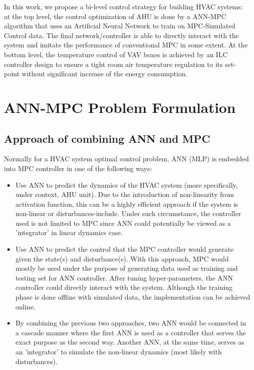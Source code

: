 \documentclass[conference]{IEEEtran}
\begin{document}
In this work, we propose a bi-level control strategy for building HVAC systems: at the top level, the control optimization of AHU is done by a ANN-MPC algorithm that uses an Artificial Neural Network to train on MPC-Simulated Control data. The final network/controller is able to directly interact with the system and imitate the performance of conventional MPC in some extent. At the bottom level, the temperature control of VAV boxes is achieved by an ILC controller design to ensure a tight room air temperature regulation to its set-point without significant increase of the energy consumption.


\section{ANN-MPC Problem Formulation}
\subsection{Approach of combining ANN and MPC}
Normally for a HVAC system optimal control problem, ANN (MLP) is embedded into MPC controller in one of the following ways:
\begin{itemize}
\item Use ANN to predict the dynamics of the HVAC system (more specifically, under context, AHU unit). Due to the introduction of non-linearity from activation function, this can be a highly efficient approach if the system is non-linear or disturbances-include. Under such circumstance, the controller used is not limited to MPC since ANN could potentially be viewed as a 'integrator' in linear dynamics case.
\item Use ANN to predict the control that the MPC controller would generate given the state(s) and disturbance(s). With this approach, MPC would mostly be used under the purpose of generating data used as training and testing set for ANN controller. After tuning hyper-parameters, the ANN controller could directly interact with the system. Although the training phase is done offline with simulated data, the implementation can be achieved online.
\item By combining the previous two approaches, two ANN would be connected in a cascade manner where the first ANN is used as a controller that serves the exact purpose as the second way. Another ANN, at the same time, serves as an 'integrator' to simulate the non-linear dynamics (most likely with disturbances).
\end{itemize}
\end{document}
